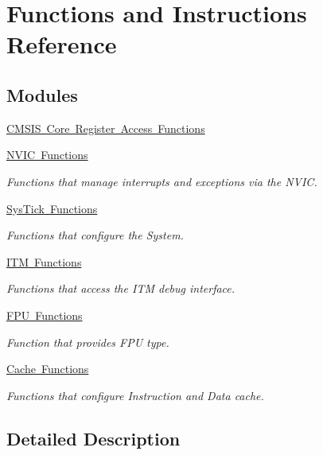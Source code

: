 \hypertarget{group___c_m_s_i_s___core___function_interface}{}\section{Functions and Instructions Reference}
\label{group___c_m_s_i_s___core___function_interface}
\subsection*{Modules}
\begin{DoxyCompactItemize}
\item 
\mbox{\hyperlink{group___c_m_s_i_s___core___reg_acc_functions}{C\+M\+S\+I\+S Core Register Access Functions}}
\item 
\mbox{\hyperlink{group___c_m_s_i_s___core___n_v_i_c_functions}{N\+V\+I\+C Functions}}
\begin{DoxyCompactList}\small\item\em Functions that manage interrupts and exceptions via the N\+V\+IC. \end{DoxyCompactList}\item 
\mbox{\hyperlink{group___c_m_s_i_s___core___sys_tick_functions}{Sys\+Tick Functions}}
\begin{DoxyCompactList}\small\item\em Functions that configure the System. \end{DoxyCompactList}\item 
\mbox{\hyperlink{group___c_m_s_i_s__core___debug_functions}{I\+T\+M Functions}}
\begin{DoxyCompactList}\small\item\em Functions that access the I\+TM debug interface. \end{DoxyCompactList}\item 
\mbox{\hyperlink{group___c_m_s_i_s___core___fpu_functions}{F\+P\+U Functions}}
\begin{DoxyCompactList}\small\item\em Function that provides F\+PU type. \end{DoxyCompactList}\item 
\mbox{\hyperlink{group___c_m_s_i_s___core___cache_functions}{Cache Functions}}
\begin{DoxyCompactList}\small\item\em Functions that configure Instruction and Data cache. \end{DoxyCompactList}\end{DoxyCompactItemize}


\subsection{Detailed Description}
